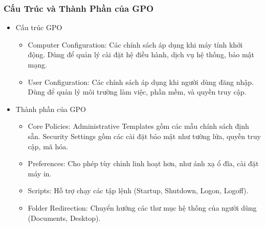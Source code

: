 \documentclass[13pt]{article}
\begin{document}
                \subsubsection{Cấu Trúc và Thành Phần của GPO}
                \begin{itemize}
                \item Cấu trúc GPO
                    \begin{itemize}
                        \item Computer Configuration: Các chính sách áp dụng khi máy tính khởi động. Dùng để quản lý cài đặt hệ điều hành, dịch vụ hệ thống, bảo mật mạng.

                        \item User Configuration: Các chính sách áp dụng khi người dùng đăng nhập. Dùng để quản lý môi trường làm việc, phần mềm, và quyền truy cập.
                        
                    \end{itemize}

                \item Thành phần của GPO
                    \begin{itemize}
                        \item Core Policies: Administrative Templates gồm các mẫu chính sách định sẵn. Security Settings gồm các cài đặt bảo mật như tường lửa, quyền truy cập, mã hóa.

                        \item Preferences: Cho phép tùy chỉnh linh hoạt hơn, như ánh xạ ổ đĩa, cài đặt máy in.

                        \item Scripts: Hỗ trợ chạy các tập lệnh (Startup, Shutdown, Logon, Logoff).

                        \item Folder Redirection: Chuyển hướng các thư mục hệ thống của người dùng (Documents, Desktop).
                        
                    \end{itemize}
                \end{itemize}
\end{document}
